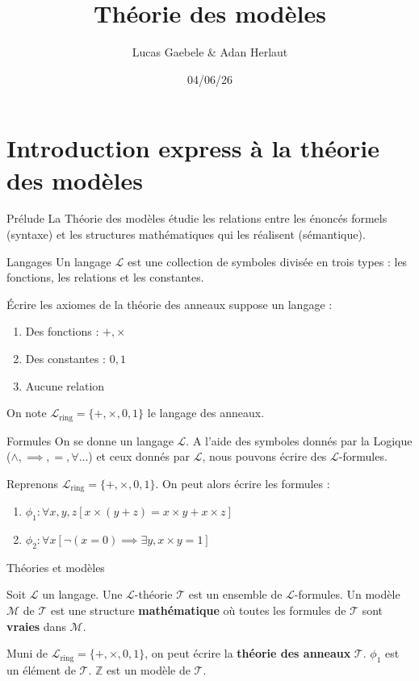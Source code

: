 \documentclass{beamer}
\title{Théorie des modèles}
\date{04/06/26}
\author{Lucas Gaebele \& Adan Herlaut}
\institute{Université Côte d'Azur}
\begin{document}
  \maketitle
  \section{Introduction express à la théorie des modèles}
\begin{frame}{Prélude}
    La Théorie des modèles étudie les relations entre les énoncés formels (syntaxe) et les structures mathématiques qui les réalisent (sémantique).
\end{frame}

\begin{frame}{Langages}
    Un langage $\mathcal{L}$ est une collection de symboles divisée en trois types : les fonctions, les relations et les constantes.
    \begin{example}
    Écrire les axiomes de la théorie des anneaux suppose un langage :
    \begin{enumerate}
    \item Des fonctions : $+, \times$
    \item Des constantes : $0, 1$
    \item Aucune relation
    \end{enumerate}
    On note $\mathcal{L}_{\text{ring}} = \{+, \times, 0, 1\}$ le langage des anneaux.
    \end{example}
\end{frame}

\begin{frame}{Formules}
On se donne un langage $\mathcal{L}$. A l'aide des symboles donnés par la Logique ($\wedge, \implies, =, \forall$...) et ceux donnés par $\mathcal{L}$,
nous pouvons écrire des $\mathcal{L}$-formules.
\begin{example}
Reprenons $\mathcal{L}_{\text{ring}} = \{+, \times, 0, 1\}$.
On peut alors écrire les formules : 
\begin{enumerate}
\item $\phi_1 : \forall x,y,z [ x \times (y+z) = x \times y + x \times z ]$
\item $ \phi_2 : \forall x [ \neg(x = 0) \implies \exists y, x \times y = 1 ]$
\end{enumerate}
\end{example}
\end{frame}

\begin{frame}{Théories et modèles}
\begin{definition}
Soit $\mathcal{L}$ un langage. Une $\mathcal{L}$-théorie $\mathcal{T}$ est un ensemble de $\mathcal{L}$-formules.
Un modèle $\mathcal{M}$ de $\mathcal{T}$ est une structure \textbf{mathématique} où toutes les formules de $\mathcal{T}$ sont \textbf{vraies} dans $\mathcal{M}$.
\end{definition}
\begin{example}
Muni de $\mathcal{L}_{\text{ring}} = \{+, \times, 0, 1\}$, on peut écrire la \textbf{théorie des anneaux} $\mathcal{T}$. $\phi_1$ est un élément de $\mathcal{T}$.
$\mathbb{Z}$ est un modèle de $\mathcal{T}$.
\end{example}
\end{frame}
\end{document}
